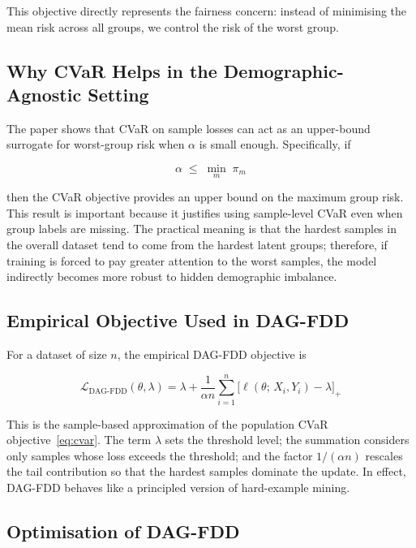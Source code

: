 This objective directly represents the fairness concern: instead of minimising the mean risk across all groups, we control the risk of the worst group.

\subsection{Why CVaR Helps in the Demographic-Agnostic Setting}
\label{subsec:dag_cvar_bound}

The paper \cite{dag_paper} shows that CVaR on sample losses can act as an upper-bound surrogate for worst-group risk when $\alpha$ is small enough. Specifically, if

\begin{equation}
    \alpha \;\leq\; \min_{m}\;\pi_m
    \label{eq:alpha_bound}
\end{equation}

\noindent then the CVaR objective provides an upper bound on the maximum group risk. This result is important because it justifies using sample-level CVaR even when group labels are missing. The practical meaning is that the hardest samples in the overall dataset tend to come from the hardest latent groups; therefore, if training is forced to pay greater attention to the worst samples, the model indirectly becomes more robust to hidden demographic imbalance.

\subsection{Empirical Objective Used in DAG-FDD}
\label{subsec:dag_objective}

For a dataset of size $n$, the empirical DAG-FDD objective is

\begin{equation}
    \mathcal{L}_{\mathrm{DAG\text{-}FDD}}(\theta,\lambda)
    = \lambda
      + \frac{1}{\alpha n}
        \sum_{i=1}^{n}
        \bigl[\ell(\theta;\,X_i,Y_i) - \lambda\bigr]_{+}
    \label{eq:dag_obj}
\end{equation}

\noindent This is the sample-based approximation of the population CVaR objective~\eqref{eq:cvar}. The term $\lambda$ sets the threshold level; the summation considers only samples whose loss exceeds the threshold; and the factor $1/(\alpha n)$ rescales the tail contribution so that the hardest samples dominate the update. In effect, DAG-FDD behaves like a principled version of hard-example mining.

\subsection{Optimisation of DAG-FDD}
\label{subsec:dag_optim}

